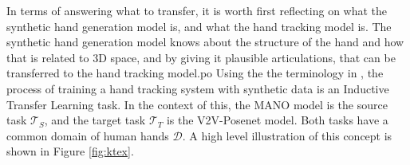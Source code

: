 In terms of answering what to transfer, it is worth first reflecting on what the synthetic hand generation model is, and what the hand tracking model is. The synthetic hand generation model knows about the structure of the hand and how that is related to 3D space, and by giving it plausible articulations, that can be transferred to the hand tracking model.po Using the the terminology in \cite{pan2009survey}, the process of training a hand tracking system with synthetic data is an Inductive Transfer Learning task. In the context of this, the MANO model is the source task $\mathcal{T}_S$, and the target task $\mathcal{T}_T$ is the V2V-Posenet model. Both tasks have a common domain of human hands $\mathcal{D}$. A high level illustration of this concept is shown in Figure \ref{fig:ktex}.


